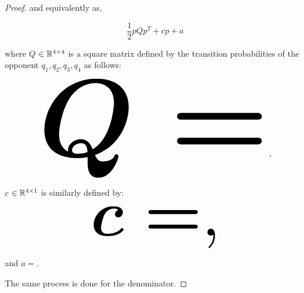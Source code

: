 \begin{proof}
and equivalently as,

\[\frac{1}{2}pQp^T + cp + a\]

where \(Q\) \(\in \mathbb{R}^{4\times4}\) is a square matrix defined by the
transition probabilities of the opponent \(q_1, q_2, q_3, q_4\) as follows:

\begin{equation*}
    \resizebox{0.8\linewidth}{!}{\arraycolsep=2.5pt%
    \boldmath\(
    Q = \)},
\end{equation*}

\(c\) \(\in \mathbb{R}^{4 \times 1}\) is similarly defined by:

\begin{equation*}
    \resizebox{0.45\linewidth}{!}{\arraycolsep=2.5pt%
    \boldmath\(c = \),}
\end{equation*}

and \(a = \).

The same process is done for the denominator.
\end{proof}